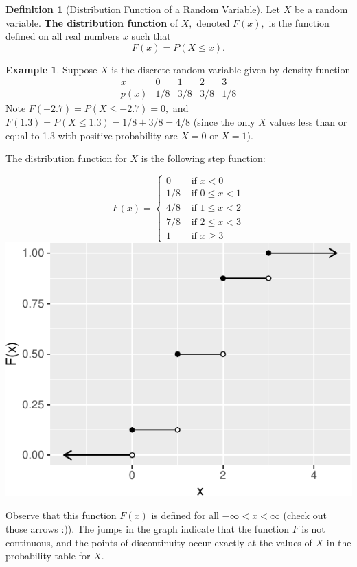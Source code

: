 \documentclass[
]{book}
\theoremstyle{definition}
\newtheorem{definition}{Definition}[chapter]
\theoremstyle{definition}
\newtheorem{example}{Example}[chapter]
\theoremstyle{definition}
\theoremstyle{definition}
\theoremstyle{remark}
\begin{document}
\begin{definition}[Distribution Function of a Random Variable]
\protect\hypertarget{def:distribution-function}{}\label{def:distribution-function}Let \(X\) be a random variable. \textbf{The distribution function} of \(X,\) denoted \(F(x),\) is the function defined on all real numbers \(x\) such that \[F(x) = P(X \leq x).\]
\end{definition}

\begin{example}
Suppose \(X\) is the discrete random variable given by density function
\[
\begin{array}{c|c|c|c|c}
x & 0 & 1 & 2 & 3 \\ \hline
p(x) & 1/8 & 3/8 & 3/8 & 1/8 
\end{array}
\]
Note \(F(-2.7) = P(X \leq -2.7) = 0,\) and \(F(1.3) = P(X \leq 1.3) = 1/8 + 3/8 = 4/8\) (since the only \(X\) values less than or equal to 1.3 with positive probability are \(X=0\) or \(X=1\)).

The distribution function for \(X\) is the following step function:

\[
F(x)=
\begin{cases}
0 &\text{ if }x < 0 \\
1/8  &\text{ if } 0 \leq x < 1 \\
4/8 &\text{ if } 1 \leq x < 2 \\
7/8 &\text{ if } 2 \leq x < 3 \\
1 &\text{ if } x \geq 3
\end{cases}
\]
\includegraphics{math340-notes_files/figure-latex/unnamed-chunk-12-1.pdf}

Observe that this function \(F(x)\) is defined for all \(-\infty < x < \infty\) (check out those arrows :)). The jumps in the graph indicate that the function \(F\) is not continuous, and the points of discontinuity occur exactly at the values of \(X\) in the probability table for \(X\).
\end{example}
\end{document}
